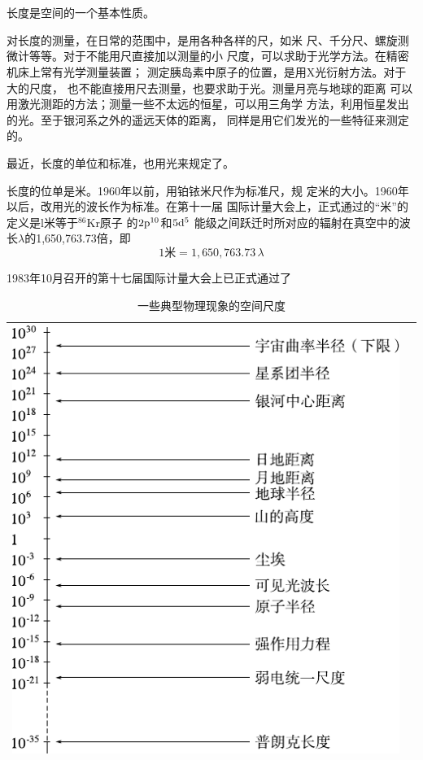 \section[长度]{}\label{sec:01.03}

长度是空间的一个基本性质。

对长度的测量，在日常的范围中，是用各种各样的尺，如米
尺、千分尺、螺旋测微计等等。对于不能用尺直接加以测量的小
尺度，可以求助于光学方法。在精密机床上常有光学测量装置；
测定胰岛素中原子的位置，是用X光衍射方法。对于大的尺度，
也不能直接用尺去测量，也要求助于光。测量月亮与地球的距离
可以用激光测距的方法；测量一些不太远的恒星，可以用三角学
方法，利用恒星发出的光。至于银河系之外的遥远天体的距离，
同样是用它们发光的一些特征来测定的。

最近，长度的单位和标准，也用光来规定了。

长度的位单是米。1960年以前，用铂铱米尺作为标准尺，规
定米的大小。1960年以后，改用光的波长作为标准。在第十一届
国际计量大会上，正式通过的“米”的定义是l米等于$^{86}$Kr原子
\clearpage\noindent
的$2\rm{p}^{10}$和$5\rm{d}^5$ %
能级之间跃迁时所对应的辐射在真空中的波长$\lambda$的1,650,763.73倍，即
\begin{equation*}
  1 \text{米} = 1,650,763.73 \, \lambda
\end{equation*}

1983年10月召开的第十七届国际计量大会上已正式通过了
\begin{table}[!h]
  \centering
  \caption{一些典型物理现象的空间尺度}
  \label{tab:01.03}
  \begin{tabular*}{\linewidth}{>{\centering}m{\linewidth}c}
    \toprule
    \includegraphics[width=0.8\linewidth]{figure/tab01.03} & \\
    \bottomrule
  \end{tabular*}
\end{table}
\clearpage


